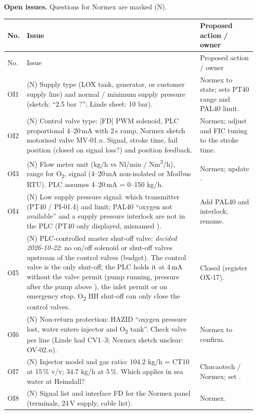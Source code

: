\documentclass[11pt,a4paper]{article}
\newcommand{\Otwo}{O\textsubscript{2}}
\begin{document}
\textbf{Open issues.} Questions for Normex are marked (N).
\begin{small}
\begin{longtable}{@{}P{9mm}P{98mm}P{48mm}@{}}
\toprule
No. & Issue & Proposed action / owner \\
\midrule
\endfirsthead
\toprule
No. & Issue & Proposed action / owner \\
\midrule
\endhead
\bottomrule
\endfoot
OI1 & (N) Supply type (LOX tank, generator, or customer supply line) and normal / minimum supply pressure (sketch: ``2.5 bar ?''; Linde sheet: 10 bar). & Normex to state; sets PT40 range and PAL40 limit. \\
OI2 & (N) Control valve type: [FD] PWM solenoid, PLC proportional 4--20\,mA with 2\,s ramp, Normex sketch motorised valve MV-01.$n$. Signal, stroke time, fail position (closed on signal loss?) and position feedback. & Normex; adjust  and FIC tuning to the stroke time. \\
OI3 & (N) Flow meter unit (kg/h vs Nl/min / Nm\textsuperscript{3}/h), range for \Otwo, signal (4--20\,mA non-isolated or Modbus RTU). PLC assumes 4--20\,mA = 0--150 kg/h. & Normex; update . \\
OI4 & (N) Low supply pressure signal: which transmitter (PT40 / PI-01.4) and limit; PAL40 ``oxygen not available'' and a supply pressure interlock are not in the PLC (PT40 only displayed, misnamed ). & Add PAL40 and interlock; rename. \\
OI5 & (N) PLC-controlled master shut-off valve: \emph{decided 2026-10-22}: no on/off solenoid or shut-off valves upstream of the control valves (budget). The control valve is the only shut-off; the PLC holds it at 4\,mA without the valve permit (pump running, pressure after the pump above ), the inlet permit or on emergency stop. \Otwo{} HH shut-off can only close the control valves. & Closed (register OX-17). \\
OI6 & (N) Non-return protection: HAZID ``oxygen pressure lost, water enters injector and \Otwo{} tank''. Check valve per line (Linde had CV1--3; Normex sketch unclear: OV-02.$n$). & Normex to confirm. \\
OI7 & (N) Injector model and gas ratio:  104.2 kg/h = CT10 at 15\,\% v/v; 34.7 kg/h at 5\,\%. Which applies in sea water at Heimdall? & Chucaotech / Normex; set . \\
OI8 & (N) Signal list and interface FD for the Normex panel (terminals, 24\,V supply, cable list). & Normex. \\

\end{longtable}
\end{small}
\end{document}
